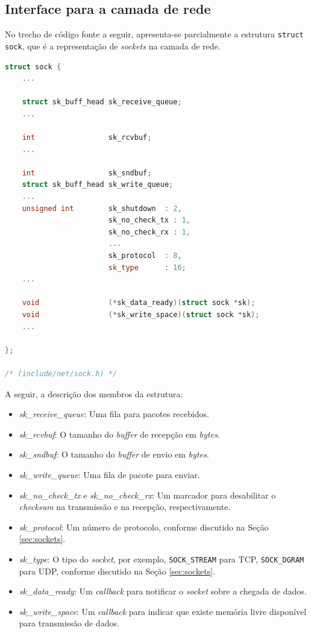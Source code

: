 \begin{anexosenv}
\section{Interface para a camada de rede}
\label{anex:sock}

No trecho de código fonte a seguir, apresenta-se parcialmente a estrutura \lstinline|struct sock|, que é a representação de \textit{sockets} na camada de rede.

\begin{lstlisting}[language=C++, caption={Estrutura que representa um \textit{socket} na camada de transporte do Linux}, label={list:sock}]
struct sock {
	...
	
	struct sk_buff_head	sk_receive_queue;
	...
	
	int					sk_rcvbuf;
	...

	int					sk_sndbuf;
	struct sk_buff_head	sk_write_queue;
	...
	unsigned int		sk_shutdown  : 2,
						sk_no_check_tx : 1,
						sk_no_check_rx : 1,
						...
						sk_protocol  : 8,
						sk_type      : 16;
	...
	
	void				(*sk_data_ready)(struct sock *sk);
	void				(*sk_write_space)(struct sock *sk);
	...
	
};
 
/* (include/net/sock.h) */
\end{lstlisting}

A seguir, a descrição dos membros da estrutura:
\begin{itemize}
\item \textit{sk\_receive\_queue}: Uma fila para pacotes recebidos.
\item \textit{sk\_rcvbuf}: O tamanho do \textit{buffer} de recepção em \textit{bytes}.
\item \textit{sk\_sndbuf}: O tamanho do \textit{buffer} de envio em \textit{bytes}.
\item \textit{sk\_write\_queue}: Uma fila de pacote para enviar.
\item \textit{sk\_no\_check\_tx} e \textit{sk\_no\_check\_rx}: Um marcador para desabilitar o \textit{checksum} na transmissão e na recepção, respectivamente.
\item \textit{sk\_protocol}: Um número de protocolo, conforme discutido na Seção \ref{sec:sockets}. 
\item \textit{sk\_type}: O tipo do \textit{socket}, por exemplo, \lstinline|SOCK_STREAM| para TCP, \lstinline|SOCK_DGRAM| para UDP, conforme discutido na Seção \ref{sec:sockets}.
\item \textit{sk\_data\_ready}: Um \textit{callback} para notificar o \textit{socket} sobre a chegada de dados.
\item \textit{sk\_write\_space}: Um \textit{callback} para indicar que existe memória livre disponível para transmissão de dados.
\end{itemize}


\end{anexosenv}

